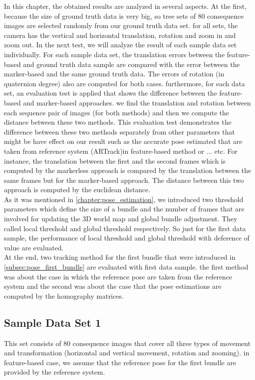 In this chapter, the obtained results are analyzed in several aspects. At the first, because the size of ground truth data is very big, so tree sets of 80 consequence images are selected randomly from our ground truth data set. for all sets, the camera has the vertical and horizontal translation, rotation and zoom in and zoom out. In the next test, we will analyze the result of each sample data set individually. For each sample data set, the translation errors between the feature-based and ground truth data sample are compared with the error between the marker-based and the same ground truth data. The errors of rotation (in quaternion degree) also are computed for both cases. furthermore, for each data set, an evaluation test is applied that shows the difference between the feature-based and marker-based approaches. we find the translation and rotation between each sequence pair of images (for both methods) and then we compute the distance between these two methods. This evaluation test demonstrates the difference between these two methods separately from other parameters that might be have effect on our result such as the accurate pose estimated that are taken from reference system (ARTrack)in feature-based method or ... etc. For instance, the translation between the first and the second frames which is computed by the markerless approach is compared by the translation between the same frames but for the marker-based approach. The distance between this two approach is computed by the euclidean distance.\\
As it was mentioned in \autoref{chapter:pose_estimation}, we introduced two threshold parameters which define the size of a bundle and the number of frames that are involved for updating the 3D world map and global bundle adjustment. They called local threshold and global threshold respectively. So just for the first data sample, the performance of local threshold and global threshold with deference of value are evaluated.\\
At the end, two tracking method for the first bundle that were introduced in \autoref{subsec:pose_first_bundle} are evaluated with first data sample. the first method was about the case in which the reference pose are taken from the reference system and the second was about the case that the pose estimations are computed by the homography matrices.

\subsection{Sample Data Set 1} \label{subsec:sample_1}
This set consists of 80 consequence images that cover all three types of movement and transformation (horizontal and vertical movement, rotation and zooming). in feature-based case, we assume that the reference pose for the first bundle are provided by the reference system.


